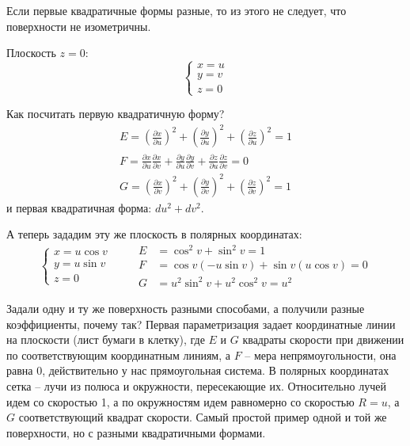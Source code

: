 \documentclass[main]{subfiles}
\begin{document}
\begin{remark}
    Если первые квадратичные формы разные, то из этого не следует, что поверхности не изометричны.
\end{remark}
\begin{example}
    Плоскость $z = 0$:
    \[\begin{cases}
            x = u \\
            y = v \\
            z = 0
        \end{cases}\]

    Как посчитать первую квадратичную форму?
    \begin{gather*}
        E = \left( \frac{\partial x}{\partial u}\right)^2 + \left(\frac{\partial y}{\partial u}\right)^2 + \left(\frac{\partial z}{\partial u}\right)^2 =1 \\
        F = \frac{\partial x}{\partial u}\frac{\partial x}{\partial v} +\frac{\partial y}{\partial u}\frac{\partial y}{\partial v} + \frac{\partial z}{\partial u}\frac{\partial z}{\partial v} = 0\\
        G = \left( \frac{\partial x}{\partial v}\right)^2 + \left(\frac{\partial y}{\partial v}\right)^2 + \left(\frac{\partial z}{\partial v}\right)^2 =1
    \end{gather*}
    и первая квадратичная форма: $du^2 + dv^2$.
\end{example}
\begin{example}
    А теперь зададим эту же плоскость в полярных координатах:
    \[\begin{cases}
            x = u \cos v \\
            y = u \sin v \\
            z = 0
        \end{cases}\qquad
        \begin{aligned}
            E & = \cos^2 v + \sin^2 v = 1                   \\
            F & = \cos v (-u \sin v) + \sin v (u\cos v) = 0 \\
            G & = u^2 \sin^2v + u^2 \cos^2 v = u^2
        \end{aligned}\]
\end{example}
Задали одну и ту же поверхность разными способами, а получили разные коэффициенты, почему так?
Первая параметризация задает координатные линии на плоскости (лист бумаги в клетку),
где $E$ и $G$ квадраты скорости при движении по соответствующим координатным линиям, а $F$ -- мера непрямоугольности, она равна 0, действительно у нас прямоугольная система.
В полярных координатах сетка -- лучи из полюса и окружности, пересекающие их.
Относительно лучей идем со скоростью 1, а по окружностям идем равномерно со скоростью $R=u$, а $G$ соответствующий квадрат скорости.
Самый простой пример одной и той же поверхности, но с разными квадратичными формами.
\end{document}
